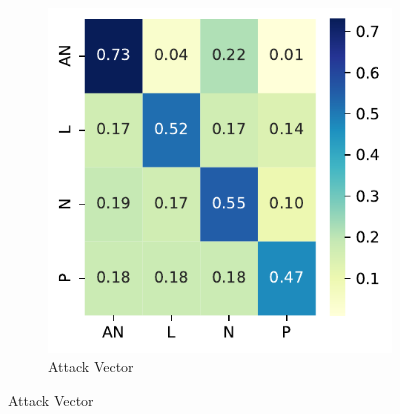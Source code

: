 \documentclass[12pt]{article}
\begin{document}
\begin{figure}
	\centering
	\begin{subfigure}[b]{0.45\textwidth}
		\includegraphics[width=\textwidth]{./figures/confusion_matrices/attack_vector_mitre.pdf}
		\caption{Attack Vector}


\end{subfigure}
\end{figure}
\end{document}
